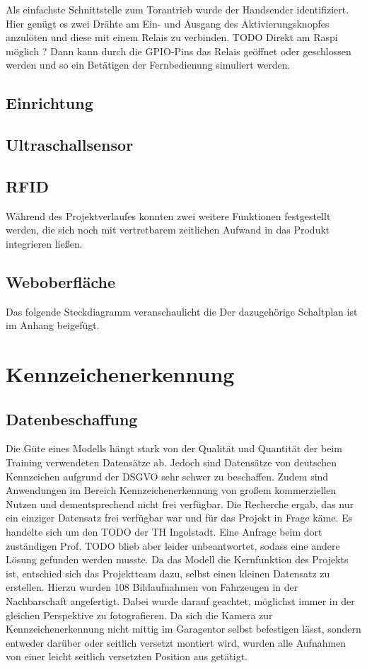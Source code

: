 Als einfachste Schnittstelle zum Torantrieb wurde der Handsender identifiziert. Hier genügt es zwei Drähte am Ein- und Ausgang des Aktivierungsknopfes anzulöten und diese mit einem Relais zu verbinden. TODO Direkt am Raspi möglich ? Dann kann durch die \ac{GPIO}-Pins das Relais geöffnet oder geschlossen werden und so ein Betätigen der Fernbedienung simuliert werden.

\section{Einrichtung}


\section{Ultraschallsensor}



\section{RFID}

Während des Projektverlaufes konnten zwei weitere Funktionen festgestellt werden, die sich noch mit vertretbarem zeitlichen Aufwand in das Produkt integrieren ließen.

\section{Weboberfläche}


Das folgende Steckdiagramm veranschaulicht die 
Der dazugehörige Schaltplan ist im Anhang beigefügt.

\nocite{*}

\chapter{Kennzeichenerkennung}

\section{Datenbeschaffung}
Die Güte eines Modells hängt stark von der Qualität und Quantität der beim Training verwendeten Datensätze ab. Jedoch sind Datensätze von deutschen Kennzeichen aufgrund der \ac{DSGVO} sehr schwer zu beschaffen. Zudem sind Anwendungen im Bereich Kennzeichenerkennung von großem kommerziellen Nutzen und dementsprechend nicht frei verfügbar. Die Recherche ergab, das nur ein einziger Datensatz frei verfügbar war und für das Projekt in Frage käme. Es handelte sich um den TODO der TH Ingolstadt. Eine Anfrage beim dort zuständigen Prof. TODO blieb aber leider unbeantwortet, sodass eine andere Lösung gefunden werden musste.
Da das Modell die Kernfunktion des Projekts ist, entschied sich das Projektteam dazu, selbst einen kleinen Datensatz zu erstellen. 
Hierzu wurden 108 Bildaufnahmen von Fahrzeugen in der Nachbarschaft angefertigt. Dabei wurde darauf geachtet, möglichst immer in der gleichen Perspektive zu fotografieren. Da sich die Kamera zur Kennzeichenerkennung nicht mittig im Garagentor selbst befestigen lässt, sondern entweder darüber oder seitlich versetzt montiert wird, wurden alle Aufnahmen von einer leicht seitlich versetzten Position aus getätigt.

